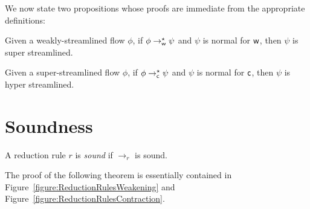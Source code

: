 We now state two propositions whose proofs are immediate from the appropriate definitions:

\begin{proposition}\label{proposition:SuperStreamlining}
Given a weakly-streamlined flow $\phi$, if $\phi\to_{\mathsf w}^\star\psi$ and $\psi$ is normal for ${\mathsf w}$, then $\psi$ is super streamlined.
\end{proposition}

\begin{proposition}\label{proposition:HyperStreamlining}
Given a super-streamlined flow $\phi$, if $\phi\to_{\mathsf c}^\star\psi$ and $\psi$ is normal for ${\mathsf c}$, then $\psi$ is hyper streamlined.
\end{proposition}


\section{Soundness}\label{section:Soundness}

\begin{definition}\label{definition:SoundRedcutionRule}
A reduction rule $r$ is \emph{sound} if $\to_r$ is sound.
\end{definition}

The proof of the following theorem is essentially contained in Figure~\vref{figure:ReductionRulesWeakening} and Figure~\vref{figure:ReductionRulesContraction}.

